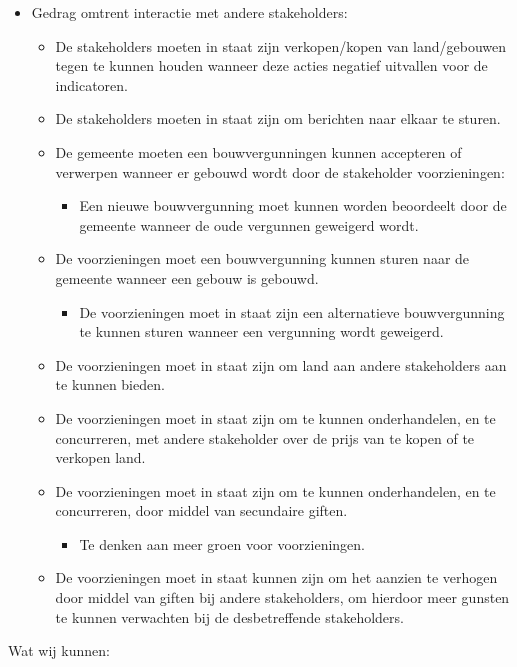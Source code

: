 \begin{itemize}
\begin{itemize}
	\end{itemize}
	\item Gedrag omtrent interactie met andere stakeholders:
	\begin{itemize}
		\item 	De stakeholders moeten in staat zijn verkopen/kopen van land/gebouwen tegen te kunnen houden wanneer deze acties negatief uitvallen voor de indicatoren.
		\item De stakeholders moeten in staat zijn om berichten naar elkaar te sturen.
		\item De gemeente moeten een bouwvergunningen kunnen accepteren of verwerpen wanneer er gebouwd wordt door de stakeholder voorzieningen:
		\begin{itemize}
			\item Een nieuwe bouwvergunning moet kunnen worden beoordeelt door de gemeente wanneer de oude vergunnen geweigerd wordt.
		\end{itemize}
	\item	De voorzieningen moet een bouwvergunning kunnen sturen naar de gemeente wanneer een gebouw is gebouwd.
	\begin{itemize}
		\item De voorzieningen moet in staat zijn een alternatieve bouwvergunning te kunnen sturen wanneer een vergunning wordt geweigerd.
	\end{itemize}	
	\item	De voorzieningen moet in staat zijn om land aan andere stakeholders aan te kunnen bieden.
	\item	De voorzieningen moet in staat zijn om te kunnen onderhandelen, en te concurreren, met andere stakeholder over de prijs van te kopen of te verkopen land.
	\item	De voorzieningen moet in staat zijn om te kunnen onderhandelen, en te concurreren, door middel van secundaire giften.
	\begin{itemize}
		\item Te denken aan meer groen voor voorzieningen.
	\end{itemize}	
	\item	De voorzieningen moet in staat kunnen zijn om het aanzien te verhogen door middel van giften bij andere stakeholders, om hierdoor meer gunsten te kunnen verwachten bij de desbetreffende stakeholders.
	\end{itemize}

\end{itemize}


Wat wij kunnen:


\newpage